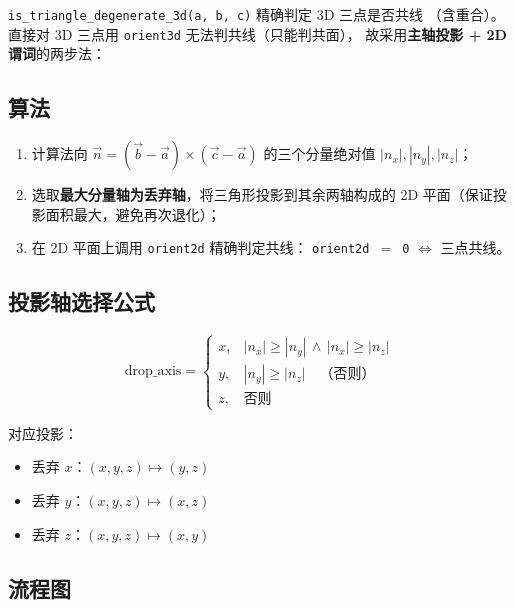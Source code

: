 \documentclass[11pt,a4paper]{article}
\begin{document}
\texttt{is\_triangle\_degenerate\_3d(a, b, c)} 精确判定 3D 三点是否共线
（含重合）。直接对 3D 三点用 \texttt{orient3d} 无法判共线（只能判共面），
故采用\textbf{主轴投影 + 2D 谓词}的两步法：

\subsection{算法}

\begin{enumerate}
  \item 计算法向 $\vec{n} = (\vec{b} - \vec{a}) \times (\vec{c} - \vec{a})$
        的三个分量绝对值 $|n_x|, |n_y|, |n_z|$；
  \item 选取\textbf{最大分量轴为丢弃轴}，将三角形投影到其余两轴构成的
        2D 平面（保证投影面积最大，避免再次退化）；
  \item 在 2D 平面上调用 \texttt{orient2d} 精确判定共线：
        \texttt{orient2d $=$ 0} $\iff$ 三点共线。
\end{enumerate}

\subsection{投影轴选择公式}

\[
  \text{drop\_axis} =
  \begin{cases}
    x, & |n_x| \ge |n_y| \,\land\, |n_x| \ge |n_z| \\
    y, & |n_y| \ge |n_z| \quad\text{（否则）} \\
    z, & \text{否则}
  \end{cases}
\]

对应投影：
\begin{itemize}
  \item 丢弃 $x$：$(x, y, z) \mapsto (y, z)$
  \item 丢弃 $y$：$(x, y, z) \mapsto (x, z)$
  \item 丢弃 $z$：$(x, y, z) \mapsto (x, y)$
\end{itemize}

\subsection{流程图}
\end{document}
